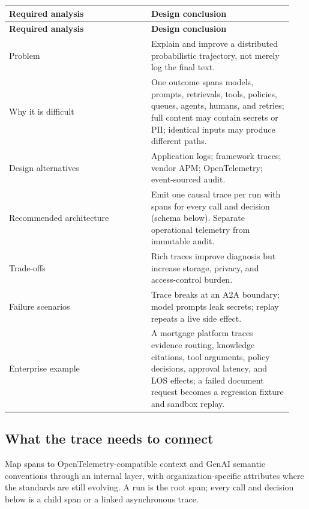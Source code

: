 \BookTableStart
\small
\begin{longtable}{@{}Y{0.4700\linewidth}Y{0.4700\linewidth}@{}}
\color{white}\bfseries \textbf{Required analysis} & \color{white}\bfseries \textbf{Design conclusion} \\
\endfirsthead
{}
\color{white}\bfseries \textbf{Required analysis} & \color{white}\bfseries \textbf{Design conclusion} \\
\endhead
Problem & Explain and improve a distributed probabilistic trajectory, not merely log the final text. \\
Why it is difficult & One outcome spans models, prompts, retrievals, tools, policies, queues, agents, humans, and retries; full content may contain secrets or PII; identical inputs may produce different paths. \\
Design alternatives & Application logs; framework traces; vendor APM; OpenTelemetry; event-sourced audit. \\
Recommended architecture & Emit one causal trace per run with spans for every call and decision (schema below). Separate operational telemetry from immutable audit. \\
Trade-offs & Rich traces improve diagnosis but increase storage, privacy, and access-control burden. \\
Failure scenarios & Trace breaks at an A2A boundary; model prompts leak secrets; replay repeats a live side effect. \\
Enterprise example & A mortgage platform traces evidence routing, knowledge citations, tool arguments, policy decisions, approval latency, and LOS effects; a failed document request becomes a regression fixture and sandbox replay. \\
\end{longtable}
\BookTableEnd

\subsection{What the trace needs to connect}

Map spans to OpenTelemetry-compatible context and GenAI semantic conventions through an internal layer, with organization-specific attributes where the standards are still evolving. A run is the root span; every call and decision below is a child span or a linked asynchronous trace.\par

